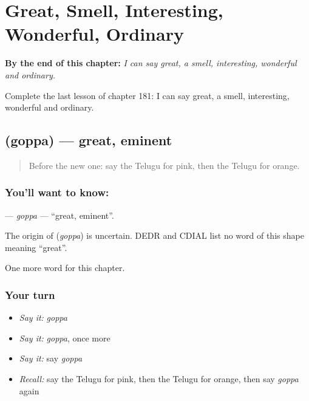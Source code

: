 
\chapter{Great, Smell, Interesting, Wonderful, Ordinary}
\label{ch:te-great-smell-interesting-wonderful-ordinary}

\begin{chapteropening}
\textbf{By the end of this chapter:} \emph{I can say great, a smell, interesting, wonderful and ordinary.}

Complete the last lesson of chapter 181: I can say great, a smell, interesting, wonderful and ordinary.
\end{chapteropening}

\section[\texorpdfstring{\te{గొప్ప} (goppa)}{గొప్ప (goppa)}]{ (goppa) — great, eminent}

\label{lesson:TE-C181-goppa}



\begin{quote}
Before the new one: say the Telugu for pink, then the Telugu for orange.
\end{quote}

\subsection*{You'll want to know: }
\textbf{} — \emph{goppa} — \textquotedblleft{}great, eminent\textquotedblright{}.

\begin{cousinweb}
The origin of \textbf{} (\emph{goppa}) is uncertain. DEDR and CDIAL list no word of this shape meaning \textquotedblleft{}great\textquotedblright{}.
\end{cousinweb}

\begin{grammarlens}[title={What you've built}]
One more word for this chapter.
\end{grammarlens}

\subsection*{Your turn}
\begin{itemize}
\raggedright
  \item \emph{Say it:} \emph{goppa}
  \item \emph{Say it:} \emph{goppa}, once more
  \item \emph{Say it:} say \emph{goppa}
  \item \emph{Recall:} say the Telugu for pink, then the Telugu for orange, then say \emph{goppa} again
\end{itemize}

